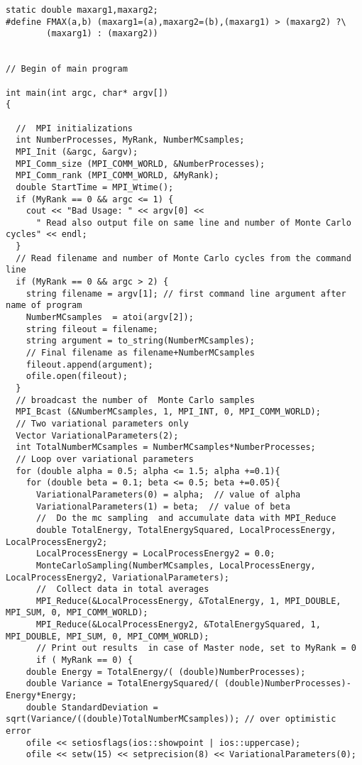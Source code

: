 \documentclass{beamer}
\begin{document}
\begin{frame}
\begin{block}{}
\begin{verbatim}
static double maxarg1,maxarg2;
#define FMAX(a,b) (maxarg1=(a),maxarg2=(b),(maxarg1) > (maxarg2) ?\
        (maxarg1) : (maxarg2))


// Begin of main program   

int main(int argc, char* argv[])
{

  //  MPI initializations
  int NumberProcesses, MyRank, NumberMCsamples;
  MPI_Init (&argc, &argv);
  MPI_Comm_size (MPI_COMM_WORLD, &NumberProcesses);
  MPI_Comm_rank (MPI_COMM_WORLD, &MyRank);
  double StartTime = MPI_Wtime();
  if (MyRank == 0 && argc <= 1) {
    cout << "Bad Usage: " << argv[0] << 
      " Read also output file on same line and number of Monte Carlo cycles" << endl;
  }
  // Read filename and number of Monte Carlo cycles from the command line
  if (MyRank == 0 && argc > 2) {
    string filename = argv[1]; // first command line argument after name of program
    NumberMCsamples  = atoi(argv[2]);
    string fileout = filename;
    string argument = to_string(NumberMCsamples);
    // Final filename as filename+NumberMCsamples
    fileout.append(argument);
    ofile.open(fileout);
  }
  // broadcast the number of  Monte Carlo samples
  MPI_Bcast (&NumberMCsamples, 1, MPI_INT, 0, MPI_COMM_WORLD);
  // Two variational parameters only
  Vector VariationalParameters(2);
  int TotalNumberMCsamples = NumberMCsamples*NumberProcesses; 
  // Loop over variational parameters
  for (double alpha = 0.5; alpha <= 1.5; alpha +=0.1){
    for (double beta = 0.1; beta <= 0.5; beta +=0.05){
      VariationalParameters(0) = alpha;  // value of alpha
      VariationalParameters(1) = beta;  // value of beta
      //  Do the mc sampling  and accumulate data with MPI_Reduce
      double TotalEnergy, TotalEnergySquared, LocalProcessEnergy, LocalProcessEnergy2;
      LocalProcessEnergy = LocalProcessEnergy2 = 0.0;
      MonteCarloSampling(NumberMCsamples, LocalProcessEnergy, LocalProcessEnergy2, VariationalParameters);
      //  Collect data in total averages
      MPI_Reduce(&LocalProcessEnergy, &TotalEnergy, 1, MPI_DOUBLE, MPI_SUM, 0, MPI_COMM_WORLD);
      MPI_Reduce(&LocalProcessEnergy2, &TotalEnergySquared, 1, MPI_DOUBLE, MPI_SUM, 0, MPI_COMM_WORLD);
      // Print out results  in case of Master node, set to MyRank = 0
      if ( MyRank == 0) {
	double Energy = TotalEnergy/( (double)NumberProcesses);
	double Variance = TotalEnergySquared/( (double)NumberProcesses)-Energy*Energy;
	double StandardDeviation = sqrt(Variance/((double)TotalNumberMCsamples)); // over optimistic error
	ofile << setiosflags(ios::showpoint | ios::uppercase);
	ofile << setw(15) << setprecision(8) << VariationalParameters(0);

\end{verbatim}
\end{block}
\end{frame}
\end{document}
